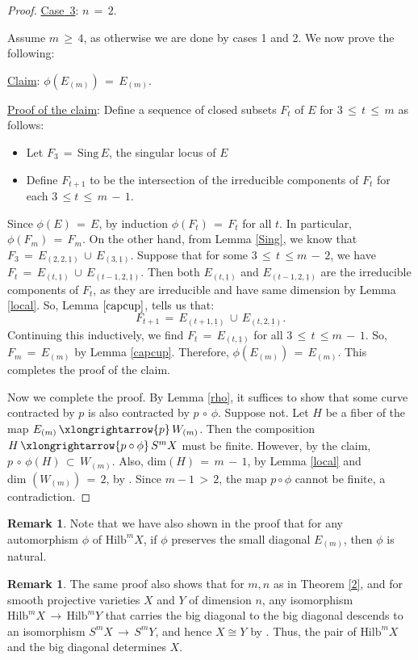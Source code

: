 \documentclass[12pt,reqno]{amsart}
\theoremstyle{definition}
\newtheorem{remark}[lemma]{Remark}
\numberwithin{equation}{section}
\begin{document}
\begin{proof}
\underline{\textrm{Case} \,3}: $n\,=\, 2$. 


 
 
Assume $m\,\geq\,4$, as otherwise we are done by cases 1 and 2. We now prove the following:

\underline{Claim}: $\phi(E_{(m)})\,=\, E_{(m)}$.


\underline{Proof of the claim}: Define a sequence of closed subsets $F_{t}$ of $E$ for $3\,\leq\, t\,\leq\, m$ as follows:
\begin{itemize}
\item Let $F_{3}\,=\,\textrm{Sing}\,E$, the singular locus of $E$
\item Define $F_{t+1}$ to be the intersection of the irreducible components of $F_{t}$ for each $3\,\leq t\,\leq\, m\,-\,1$.
\end{itemize}

Since $\phi(E)\,=\, E$, by induction $\phi(F_{t})\,=\, F_{t}$ for all $t$. In particular, $\phi(F_{m})\,=\, F_{m}$. On the other hand, from Lemma \ref{Sing},  we know that $F_{3}\,=\, E_{(2,2,\underline{1})}\,\cup\, E_{(3, \underline{1})}$. Suppose that for some $3\,\leq\, t\,\leq m\,-\,2$, we have $F_{t}\,=\, E_{(t,\underline{1})}\,\cup\, E_{(t-1, 2, \underline{1})}$.  Then both $E_{(t,\underline{1})}$ and $E_{(t-1,2, \underline{1})}$ are the irreducible components of $F_{t}$, as they are irreducible and have same dimension by Lemma \ref{local}. So, Lemma $\ref{capcup}$, tells us that:
$$F_{t+1}\,=\, E_{(t+1,\underline{1})}\,\cup\, E_{(t, 2, \underline{1})}.$$ 
Continuing this inductively, we find $F_{t}\,=\, E_{(t,\underline{1})}$ for all $3\,\leq\,t\,\leq m\,-\,1$. So, $F_{m}\,=\, E_{(m)}$ by Lemma \ref{capcup}. Therefore, $\phi(E_{(m)})\,=\, E_{(m)}$. This completes the proof of the claim.


Now we complete the proof. By Lemma \ref{rho}, it suffices to show that some curve contracted by $p$ is also contracted by $p\,\circ\,\phi$. Suppose not. Let $H$ be a fiber of  the map $E_{(m)}\,\xlongrightarrow{p}\,W_{(m)}$. Then the composition $H\,\xlongrightarrow{p\circ\phi}\,S^{m}X$ must be finite. However, by the claim, $p\,\circ\,\phi(H)\,\subset\, W_{(m)}$. Also, $\text{dim}(H)\,=\, m\,-\,1$, by Lemma \ref{local} and $\textrm{dim }(W_{(m)})\,=\, 2$, by {\cite[Theorem 2]{BSV3}}. Since $m-1\,>\,2$, the map $p\circ \phi$ cannot be finite, a contradiction. 
\end{proof}
\begin{remark}
Note that we have also shown in the proof that for any automorphism $\phi$ of $\textrm{Hilb}^{m}X$, if $\phi$ preserves the small diagonal $E_{(m)}$, then $\phi$ is natural.
\end{remark}
\begin{remark}\label{determine}
    The same proof also shows that for $m,n$ as in Theorem \ref{2}, and for smooth projective varieties $X$ and $Y$ of dimension $n$, any isomorphism $\textrm{Hilb}^{m}X\,\to\, \textrm{Hilb}^{m}Y$ that carries the big diagonal to the big diagonal descends to an isomorphism $S^mX\,\to\, S^mY$, and hence $X\cong Y$ by {\cite[Corollary 4.2]{BSV4}}. Thus, the pair of $\textrm{Hilb}^{m}X$ and the big diagonal determines $X.$
\end{remark}
\end{document}
